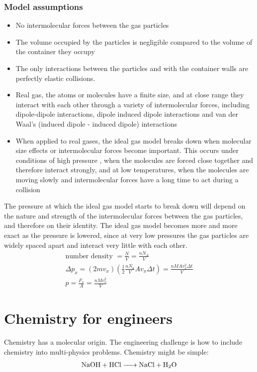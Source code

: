 \subsubsection{Model assumptions}
\begin{itemize}
	\item No intermolecular forces between the gas particles
	\item The volume occupied by the particles is negligible compared to the volume of the container they occupy
	\item The only interactions between the particles and with the container walls are perfectly elastic collisions.
	\item Real gas, the atoms or molecules have a finite size, and at close range they interact with each other through a variety of intermolecular forces, including dipole-dipole interactions, dipole induced dipole interactions and van der Waal's (induced dipole - induced dipole) interactions
	\item When applied to real gases, the ideal gas model breaks down when molecular size effects or intermolecular forces become important. This occurs under conditions of high pressure , when the molecules are forced close together and therefore interact strongly, and at low temperatures, when the molecules are moving slowly and intermolecular forces have a long time to act during a collision
\end{itemize}
The pressure at which the ideal gas model starts to break down will depend on the nature and strength of the intermolecular forces between the gas particles, and therefore on their identity. The ideal gas model becomes more and more exact as the pressure is lowered, since at very low pressures the gas particles are widely spaced apart and interact very little with each other.
\begin{gather}
	\textrm{number density } = \frac{N}{V} = \frac{nN_A}{V}\\
	\Delta p_x = \left(2mv_x\right)\left(\frac{1}{2}\frac{nN_a}{V}Av_x \Delta t\right) = \frac{nMAv_x^2 \Delta t}{V}\\
	p = \frac{F_x}{A} = \frac{nMv_x^2}{V}
\end{gather}
\section{Chemistry for engineers}
Chemistry has a molecular origin. The engineering challenge is how to include chemistry into multi-physics problems. Chemistry might be simple:
\begin{gather}
	\ce{NaOH + HCl -> NaCl + H2O}
\end{gather}